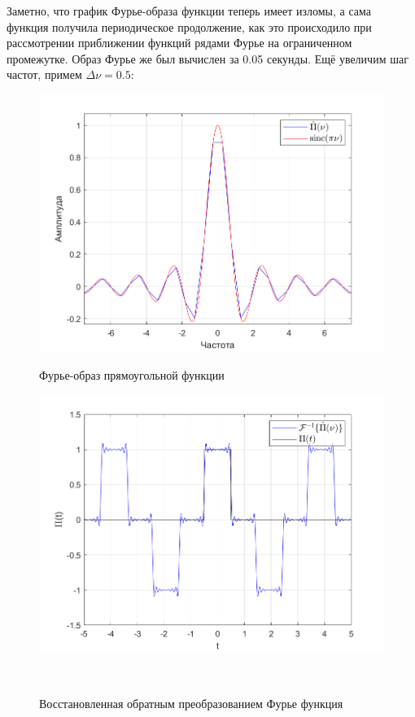 \documentclass[a4paper]{article}
\begin{document}
Заметно, что график Фурье-образа функции теперь имеет изломы, а сама функция получила периодическое продолжение, как это происходило при рассмотрении приближении функций рядами Фурье на ограниченном промежутке. Образ Фурье же был вычислен за 0.05 секунды. Ещё увеличим шаг частот, примем $\Delta \nu = 0.5$: 

\begin{figure}[H]
    \begin{minipage}{0.5\textwidth}
        \centering \includegraphics[width=\textwidth]{graphs/1/T_10_dt_0.001_V_15_dv_0.5/fourier_numerical.png}
        \caption{Фурье-образ прямоугольной функции}
    \end{minipage}\hfill
    \begin{minipage}{0.5\textwidth}
        \centering \includegraphics[width=\textwidth]{graphs/1/T_10_dt_0.001_V_15_dv_0.5/func_inversed_fourier.png}
        \caption{Восстановленная обратным преобразованием Фурье функция}
    \end{minipage}\\[1em]
\end{figure}\noindent\
\end{document}
